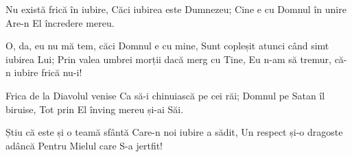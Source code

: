 \beginverse
Nu există frică în iubire,
Căci iubirea este Dumnezeu;
Cine e cu Domnul în unire
Are-n El încredere mereu.
\endverse

\beginchorus
O, da, eu nu mă tem, căci Domnul e cu mine,
Sunt copleșit atunci când simt iubirea Lui;
Prin valea umbrei morții dacă merg cu Tine,
Eu n-am să tremur, că-n iubire frică nu-i!
\endchorus

\beginverse
Frica de la Diavolul venise
Ca să-i chinuiască pe cei răi;
Domnul pe Satan îl biruise,
Tot prin El înving mereu și-ai Săi.
\endverse

\beginverse
Știu că este și o teamă sfântă
Care-n noi iubire a sădit,
Un respect și-o dragoste adâncă
Pentru Mielul care S-a jertfit!
\endverse
\endsong